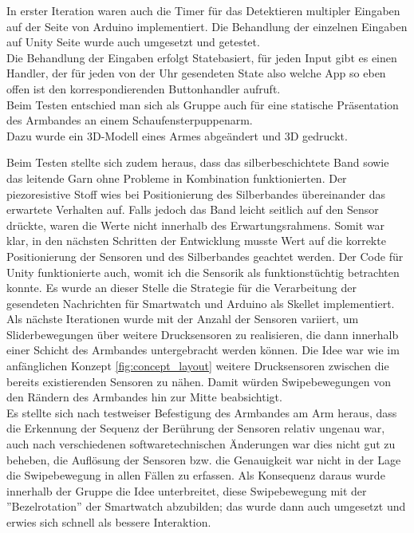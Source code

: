 \documentclass[11pt, a4paper]{article}
\begin{document}
In erster Iteration waren auch die Timer für das Detektieren multipler Eingaben auf der Seite von Arduino implementiert. Die Behandlung der einzelnen Eingaben auf Unity Seite wurde auch umgesetzt und getestet.\\
Die Behandlung der Eingaben erfolgt Statebasiert, für jeden Input gibt es einen Handler, der für jeden von der Uhr gesendeten State also welche App so eben offen ist den korrespondierenden Buttonhandler aufruft.\\
Beim Testen entschied man sich als Gruppe auch für eine statische Präsentation des Armbandes an einem Schaufensterpuppenarm.\\
Dazu wurde ein 3D-Modell eines Armes abgeändert und 3D gedruckt.


\newpage


Beim Testen stellte sich zudem heraus, dass das silberbeschichtete Band sowie das leitende Garn ohne Probleme in Kombination funktionierten. 
Der piezoresistive Stoff wies bei Positionierung des Silberbandes übereinander das erwartete Verhalten auf. Falls jedoch das Band leicht seitlich auf den Sensor drückte, waren die Werte nicht innerhalb des Erwartungsrahmens.
Somit war klar, in den nächsten Schritten der Entwicklung musste Wert auf die korrekte Positionierung der Sensoren und des Silberbandes geachtet werden.
Der Code für Unity funktionierte auch, womit ich die Sensorik als funktionstüchtig betrachten konnte. Es wurde an dieser Stelle die Strategie für die Verarbeitung der gesendeten Nachrichten für Smartwatch und Arduino als Skellet implementiert.
\\
Als nächste Iterationen wurde mit der Anzahl der Sensoren variiert, um Sliderbewegungen über weitere Drucksensoren zu realisieren, die dann innerhalb einer Schicht des Armbandes untergebracht werden können. 
Die Idee war wie im anfänglichen Konzept \ref{fig:concept_layout} weitere Drucksensoren zwischen die bereits existierenden Sensoren zu nähen.
Damit würden Swipebewegungen von den Rändern des Armbandes hin zur Mitte beabsichtigt. \\
Es stellte sich nach testweiser Befestigung des Armbandes am Arm heraus, dass die Erkennung der Sequenz der Berührung der Sensoren relativ ungenau war, auch nach verschiedenen softwaretechnischen Änderungen war dies nicht gut zu beheben, die Auflösung der Sensoren bzw. die Genauigkeit war nicht in der Lage die Swipebewegung in allen Fällen zu erfassen.
Als Konsequenz daraus wurde innerhalb der Gruppe die Idee unterbreitet, diese Swipebewegung mit der ''Bezelrotation'' der Smartwatch abzubilden; das wurde dann auch umgesetzt und erwies sich schnell als bessere Interaktion.
\end{document}
